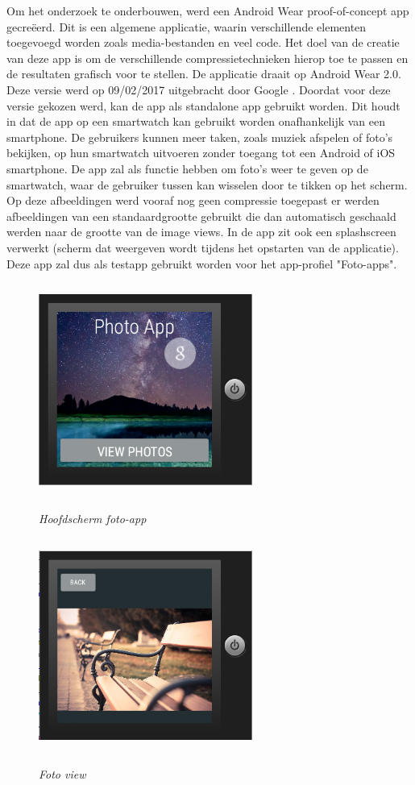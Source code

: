 Om het onderzoek te onderbouwen, werd een Android Wear proof-of-concept app gecreëerd. Dit is een algemene applicatie, waarin verschillende elementen toegevoegd worden zoals media-bestanden en veel code. Het doel van de creatie van deze app is om de verschillende compressietechnieken hierop toe te passen en de resultaten grafisch voor te stellen. De applicatie draait op Android Wear 2.0. Deze versie werd op 09/02/2017 uitgebracht door Google \autocite{Google}. Doordat voor deze versie gekozen werd, kan de app als standalone app gebruikt worden. Dit houdt in dat de app op een smartwatch kan gebruikt worden onafhankelijk van een smartphone. De gebruikers kunnen meer taken, zoals muziek afspelen of foto's bekijken, op hun smartwatch uitvoeren zonder toegang tot een Android of iOS smartphone. De app zal als functie hebben om foto's weer te geven op de smartwatch, waar de gebruiker tussen kan wisselen door te tikken op het scherm. Op deze afbeeldingen werd vooraf nog geen compressie toegepast er werden afbeeldingen van een standaardgrootte gebruikt die dan automatisch geschaald werden naar de grootte van de image views. In de app zit ook een splashscreen verwerkt (scherm dat weergeven wordt tijdens het opstarten van de applicatie). Deze app zal dus als testapp gebruikt worden voor het app-profiel "Foto-apps". 
\begin{figure}[H]
	\centering
	\caption{\textit{Hoofdscherm foto-app}}
	\includegraphics[width=7cm, height=7cm, keepaspectratio]{img/photoappmain}\\[.5cm]
\end{figure}
\begin{figure}[H]
	\centering
	\caption{\textit{Foto view}}
	\includegraphics[width=7cm, height=7cm, keepaspectratio]{img/photoappgallery}\\[.5cm]
	
\end{figure}
